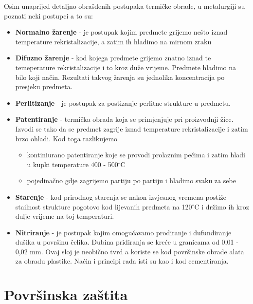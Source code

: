 \documentclass[a4paper,12pt]{article}
\numberwithin{figure}{section}
\begin{document}
Osim unaprijed detaljno obrašđenih postupaka termičke obrade, u metalurgiji su poznati neki postupci a to su:
\begin{itemize}
\item \textbf{Normalno žarenje} - je postupak kojim predmete grijemo nešto iznad temperature rekristalizacije, a zatim ih hladimo na mirnom zraku
\item \textbf{Difuzno žarenje} - kod kojega predmete grijemo znatno iznad te temeperature rekristalizacije i to kroz duže vrijeme. Predmete hladimo na bilo koji način. Rezultati takvog žarenja su jednolika koncentracija po presjeku predmeta.
\item \textbf{Perlitizanje} - je postupak za postizanje perlitne strukture u predmetu.
\item \textbf{Patentiranje} - termička obrada koja se primjenjuje pri proizvodnji žice. Izvodi se tako da se predmet zagrije iznad temperature rekristalizacije i zatim brzo ohladi. Kod toga razlikujemo
\begin{itemize}
\item kontiniurano patentiranje koje se provodi prolaznim pečima i zatim hladi u kupki temperature 400 - 500$^{\circ}$C
\item pojedinačno gdje zagrijemo partiju po partiju i hladimo svaku za sebe
\end{itemize}
\item \textbf{Starenje} - kod prirodnog starenja se nakon izvjesnog vremena postiže stailnost strukture pogotovo kod lijevanih predmeta na 120$^{\circ}$C i držimo ih kroz dulje vrijeme na toj temperaturi.
\item \textbf{Nitriranje} - je postupak kojim omogućavamo prodiranje i dufundiranje dušika u površinu čelika. Dubina pridiranja se kreće u granicama od 0,01 - 0,02 mm. Ovaj sloj je neobično tvrd a koriste se kod površinske obrade alata za obradu plastike. Naćin i principi rada isti su kao i kod cementiranja.
\end{itemize}
\section{Površinska zaštita}
\end{document}
